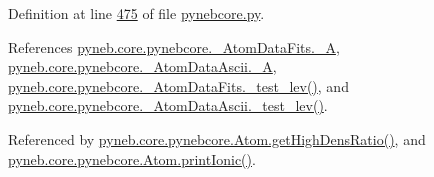 Definition at line \hyperlink{pynebcore_8py_source_l00475}{475} of file \hyperlink{pynebcore_8py_source}{pynebcore.\+py}.



References \hyperlink{pynebcore_8py_source_l00093}{pyneb.\+core.\+pynebcore.\+\_\+\+Atom\+Data\+Fits.\+\_\+\+A}, \hyperlink{pynebcore_8py_source_l00402}{pyneb.\+core.\+pynebcore.\+\_\+\+Atom\+Data\+Ascii.\+\_\+\+A}, \hyperlink{pynebcore_8py_source_l00171}{pyneb.\+core.\+pynebcore.\+\_\+\+Atom\+Data\+Fits.\+\_\+test\+\_\+lev()}, and \hyperlink{pynebcore_8py_source_l00435}{pyneb.\+core.\+pynebcore.\+\_\+\+Atom\+Data\+Ascii.\+\_\+test\+\_\+lev()}.



Referenced by \hyperlink{pynebcore_8py_source_l01653}{pyneb.\+core.\+pynebcore.\+Atom.\+get\+High\+Dens\+Ratio()}, and \hyperlink{pynebcore_8py_source_l02167}{pyneb.\+core.\+pynebcore.\+Atom.\+print\+Ionic()}.


